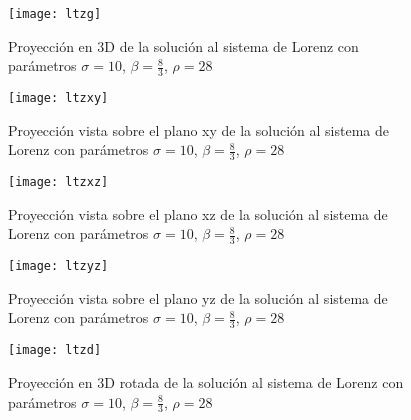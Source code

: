 \begin{figure}[p!]
\centering
\texttt{[image: ltzg]}
\caption{Proyección en 3D de la solución al sistema de Lorenz con parámetros $\sigma = 10$, $\beta = \frac{8}{3}$, $\rho = 28$}
\label{lg}
\end{figure}

\begin{figure}[p!]
\centering
\texttt{[image: ltzxy]}
\caption{Proyección vista sobre el plano xy de la solución al sistema de Lorenz con parámetros $\sigma = 10$, $\beta  = \frac{8}{3}$, $\rho = 28$}
\label{lxy}
\end{figure}

\begin{figure}[p!]
\centering
\texttt{[image: ltzxz]}
\caption{Proyección vista sobre el plano xz de la solución al sistema de Lorenz con parámetros $\sigma  = 10$, $\beta  = \frac{8}{3}$, $\rho = 28$}
\label{lxz}
\end{figure}

\begin{figure}[p!]
\centering
\texttt{[image: ltzyz]}
\caption{Proyección vista sobre el plano yz de la solución al sistema de Lorenz con parámetros $\sigma  = 10$, $\beta  = \frac{8}{3}$, $\rho  = 28$}
\label{lyz}
\end{figure}

\begin{figure}[p!]
\centering
\texttt{[image: ltzd]}
\caption{Proyección en 3D rotada de la solución al sistema de Lorenz con parámetros $\sigma  = 10$, $\beta  = \frac{8}{3}$, $\rho = 28$}
\label{ld}
\end{figure}

\pagebreak

\newpage

